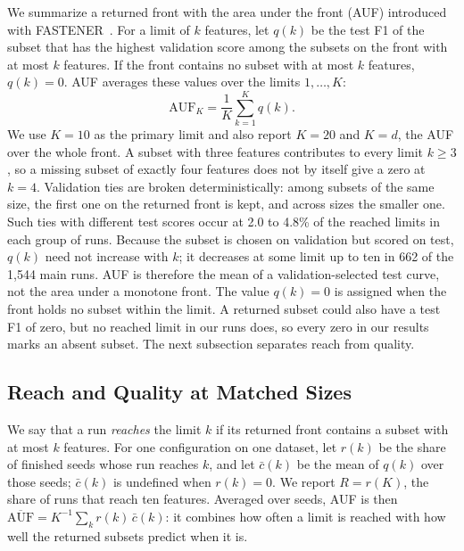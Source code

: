 We summarize a returned front with the area under the front (AUF) introduced with FASTENER~\cite{Koprivec2020}. For a limit of $k$ features, let $q(k)$ be the test F1 of the subset that has the highest validation score among the subsets on the front with at most $k$ features. If the front contains no subset with at most $k$ features, $q(k) = 0$. AUF averages these values over the limits $1, \dots, K$:
\begin{equation}
  \mathrm{AUF}_K = \frac{1}{K} \sum_{k=1}^{K} q(k).
  \label{eq:auf}
\end{equation}
We use $K = 10$ as the primary limit and also report $K = 20$ and $K = d$, the AUF over the whole front. A subset with three features contributes to every limit $k \geq 3$, so a missing subset of exactly four features does not by itself give a zero at $k = 4$. Validation ties are broken deterministically: among subsets of the same size, the first one on the returned front is kept, and across sizes the smaller one. Such ties with different test scores occur at 2.0 to 4.8\% of the reached limits in each group of runs. Because the subset is chosen on validation but scored on test, $q(k)$ need not increase with $k$; it decreases at some limit up to ten in 662 of the 1{,}544 main runs. AUF is therefore the mean of a validation-selected test curve, not the area under a monotone front. The value $q(k) = 0$ is assigned when the front holds no subset within the limit. A returned subset could also have a test F1 of zero, but no reached limit in our runs does, so every zero in our results marks an absent subset. The next subsection separates reach from quality.

\subsection{Reach and Quality at Matched Sizes}
\label{sec:reach}

We say that a run \emph{reaches} the limit $k$ if its returned front contains a subset with at most $k$ features. For one configuration on one dataset, let $r(k)$ be the share of finished seeds whose run reaches $k$, and let $\bar{c}(k)$ be the mean of $q(k)$ over those seeds; $\bar{c}(k)$ is undefined when $r(k) = 0$. We report $R = r(K)$, the share of runs that reach ten features. Averaged over seeds, AUF is then $\overline{\mathrm{AUF}} = K^{-1} \sum_k r(k)\,\bar{c}(k)$: it combines how often a limit is reached with how well the returned subsets predict when it is.

